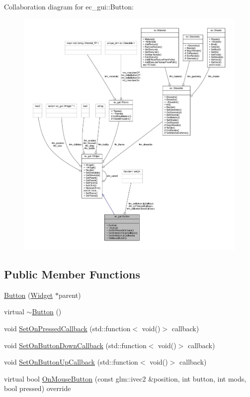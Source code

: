 Collaboration diagram for ec\+\_\+gui\+:\+:Button\+:
\nopagebreak
\begin{figure}[H]
\begin{center}
\leavevmode
\includegraphics[width=350pt]{classec__gui_1_1_button__coll__graph}
\end{center}
\end{figure}
\subsection*{Public Member Functions}
\begin{DoxyCompactItemize}
\item 
\mbox{\hyperlink{classec__gui_1_1_button_a179c52041fa20bbfc088020bafc31056}{Button}} (\mbox{\hyperlink{classec__gui_1_1_widget}{Widget}} $\ast$parent)
\item 
virtual \mbox{\hyperlink{classec__gui_1_1_button_a4e6b3dc59f83c39f5f644e8040f7577f}{$\sim$\+Button}} ()
\item 
void \mbox{\hyperlink{classec__gui_1_1_button_a81c99c46bc9f747cdacdafa813f6974e}{Set\+On\+Pressed\+Callback}} (std\+::function$<$ void()$>$ callback)
\item 
void \mbox{\hyperlink{classec__gui_1_1_button_a0c8039773e843b8e6d05058969b24a23}{Set\+On\+Button\+Down\+Callback}} (std\+::function$<$ void()$>$ callback)
\item 
void \mbox{\hyperlink{classec__gui_1_1_button_a39a9d1fa701cd83ee5818df093aa1bd3}{Set\+On\+Button\+Up\+Callback}} (std\+::function$<$ void()$>$ callback)
\item 
virtual bool \mbox{\hyperlink{classec__gui_1_1_button_a9df65865d810e2ba198905cdf691f9be}{On\+Mouse\+Button}} (const glm\+::ivec2 \&position, int button, int mods, bool pressed) override
\end{DoxyCompactItemize}
